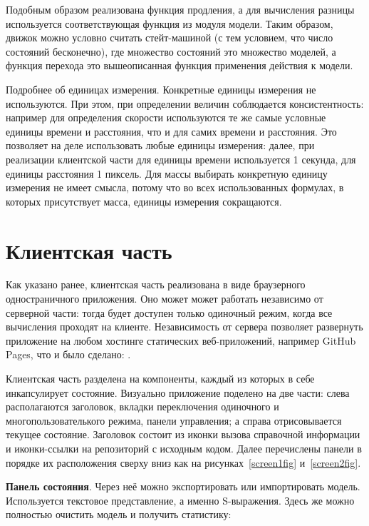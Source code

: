 Подобным образом реализована функция продления, а для вычисления разницы используется соответствующая функция из модуля модели.
Таким образом, движок можно условно считать стейт-машиной (с тем условием, что число состояний бесконечно),
где множество состояний это множество моделей, а функция перехода это вышеописанная функция применения действия к модели.

Подробнее об единицах измерения. Конкретные единицы измерения не используются.
При этом, при определении величин соблюдается консистентность: например для определения скорости используются
те же самые условные единицы времени и расстояния, что и для самих времени и расстояния. Это позволяет на деле использовать
любые единицы измерения: далее, при реализации клиентской части для единицы времени используется 1 секунда,
для единицы расстояния 1 пиксель. Для массы выбирать конкретную единицу измерения не имеет смысла, потому что во всех
использованных формулах, в которых присутствует масса, единицы измерения сокращаются.

\section{Клиентская часть}\label{clientimpl}

Как указано ранее, клиентская часть реализована в виде браузерного одностраничного приложения.
Оно может может работать независимо от серверной части: тогда будет доступен только одиночный режим,
когда все вычисления проходят на клиенте. Независимость от сервера позволяет развернуть приложение на
любом хостинге статических веб-приложений, например GitHub Pages, что и было сделано:
\underline{}.

Клиентская часть разделена на компоненты, каждый из которых в себе инкапсулирует состояние.
Визуально приложение поделено на две части: слева располагаются заголовок,
вкладки переключения одиночного и многопользователького режима, панели управления;
а справа отрисовывается текущее состояние.
Заголовок состоит из иконки вызова справочной информации
и иконки-ссылки на репозиторий с исходным кодом. Далее перечислены панели в порядке их
расположения сверху вниз как на рисунках~\ref{screen1fig} и~\ref{screen2fig}.

\textbf{Панель состояния}. Через неё можно экспортировать или импортировать модель.
Используется текстовое представление, а именно S-выражения. Здесь же можно полностью очистить модель и
получить статистику:

